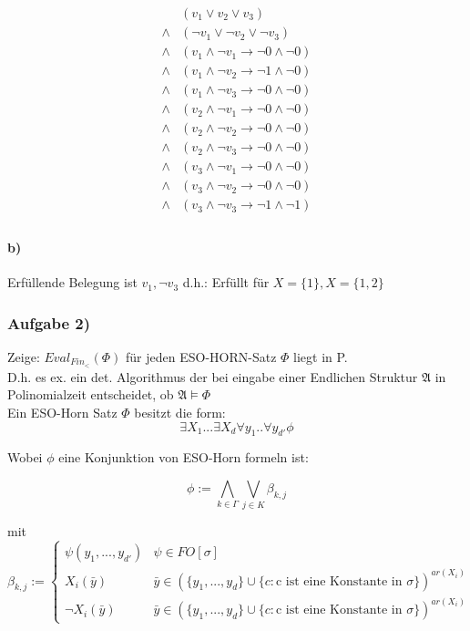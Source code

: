 \documentclass[12pt]{article}
\begin{document}
\[ 
\begin{array}{rl}
   &     ( v_1 \lor v_2 \lor v_3) \\
  \land& (\neg v_1 \lor \neg v_2 \lor \neg v_3) \\
  \land& ( v_1 \land \neg v_1 \rightarrow \neg 0  \land \neg 0 ) \\
  \land& ( v_1 \land \neg v_2 \rightarrow \neg 1  \land \neg 0 ) \\
  \land& ( v_1 \land \neg v_3 \rightarrow \neg 0  \land \neg 0 ) \\
  \land& ( v_2 \land \neg v_1 \rightarrow \neg 0  \land \neg 0 ) \\
  \land& ( v_2 \land \neg v_2 \rightarrow \neg 0  \land \neg 0 ) \\
  \land& ( v_2 \land \neg v_3 \rightarrow \neg 0  \land \neg 0 ) \\
  \land& ( v_3 \land \neg v_1 \rightarrow \neg 0  \land \neg 0 ) \\
  \land& ( v_3 \land \neg v_2 \rightarrow \neg 0  \land \neg 0 ) \\
  \land& ( v_3 \land \neg v_3 \rightarrow \neg 1  \land \neg 1 ) \\
\end{array}
 \] 
 
 \paragraph{b)}
 Erfüllende Belegung ist $v_1, \neg v_3 $
 d.h.: Erfüllt für $X=\{1\}, X=\{1,2\}$
 
\subsubsection*{Aufgabe 2)}
Zeige: $Eval_{Fin_{<}}(\Phi)$ für jeden ESO-HORN-Satz $\Phi$ liegt in P.\\
D.h. es ex. ein det. Algorithmus der bei eingabe einer Endlichen Struktur $\mathfrak{A}$ in Polinomialzeit entscheidet, ob $\mathfrak{A} \models \Phi$ \\

Ein ESO-Horn Satz $\Phi$ besitzt die form:
\[  \exists X_1 ... \exists X_d \forall y_1 .. \forall y_{d'} \phi \] 

Wobei $\phi$ eine Konjunktion von ESO-Horn formeln ist:

\[ \phi := \bigwedge_{k\in \Gamma} \bigvee_{j\in K} \beta_{k,j} \] 

mit 
\[ \beta_{k,j} := 
  \begin{cases}
    \psi(y_1,...,y_{d'}) & \psi\in FO[\sigma]\\
    X_i(\bar y) & \bar y \in (\{y_1,...,y_d\}\cup\{c:\text{c ist eine Konstante in }\sigma\})^{ar(X_i)} \\
    \neg X_i(\bar y)& \bar y \in (\{y_1,...,y_d\}\cup\{c:\text{c ist eine Konstante in }\sigma\})^{ar(X_i)}
  \end{cases}
\] 
\end{document}
